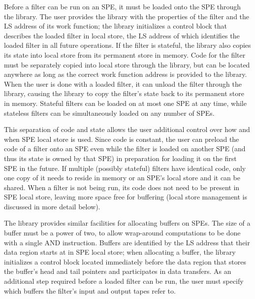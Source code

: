 Before a filter can be run on an SPE, it must be loaded onto the SPE through the library. The user provides the library with the properties of the filter and the LS address of its work function; the library initializes a control block that describes the loaded filter in local store, the LS address of which identifies the loaded filter in all future operations. If the filter is stateful, the library also copies its state into local store from its permanent store in memory. Code for the filter must be separately copied into local store through the library, but can be located anywhere as long as the correct work function address is provided to the library. When the user is done with a loaded filter, it can unload the filter through the library, causing the library to copy the filter's state back to its permanent store in memory. Stateful filters can be loaded on at most one SPE at any time, while stateless filters can be simultaneously loaded on any number of SPEs.

This separation of code and state allows the user additional control over how and when SPE local store is used. Since code is constant, the user can preload the code of a filter onto an SPE even while the filter is loaded on another SPE (and thus its state is owned by that SPE) in preparation for loading it on the first SPE in the future. If multiple (possibly stateful) filters have identical code, only one copy of it needs to reside in memory or an SPE's local store and it can be shared. When a filter is not being run, its code does not need to be present in SPE local store, leaving more space free for buffering (local store management is discussed in more detail below).

The library provides similar facilities for allocating buffers on SPEs. The size of a buffer must be a power of two, to allow wrap-around computations to be done with a single \textsf{AND} instruction. Buffers are identified by the LS address that their data region starts at in SPE local store; when allocating a buffer, the library initializes a control block located immediately before the data region that stores the buffer's head and tail pointers and participates in data transfers. As an additional step required before a loaded filter can be run, the user must specify which buffers the filter's input and output tapes refer to.

